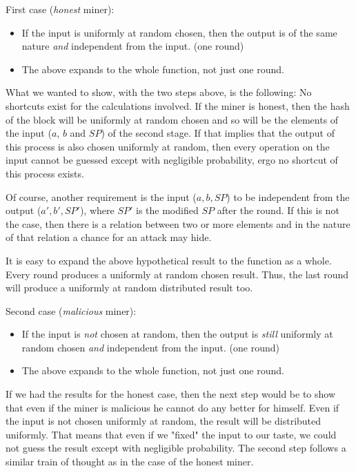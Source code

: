 First case (\emph{honest} miner):
\begin{itemize}
  \item If the input is uniformly at random chosen, then the output is of the same nature \emph{and} independent from the input. (one round)
  \item The above expands to the whole function, not just one round.
\end{itemize}

What we wanted to show, with the two steps above, is the following: No shortcuts exist for the calculations involved. If the miner is honest, then the hash of the block will be uniformly at random chosen and so will be the elements of the input ($a$, $b$ and $SP$) of the second stage. If that implies that the output of this process is also chosen uniformly at random, then every operation on the input cannot be guessed except with negligible probability, ergo no shortcut of this process exists.

Of course, another requirement is the input ($a,b,SP$) to be independent from the output ($a',b',SP'$), where $SP'$ is the modified $SP$ after the round. If this is not the case, then there is a relation between two or more elements and in the nature of that relation a chance for an attack may hide.

It is easy to expand the above hypothetical result to the function as a whole. Every round produces a uniformly at random chosen result. Thus, the last round will produce a uniformly at random distributed result too.

Second case (\emph{malicious} miner):
\begin{itemize}
  \item If the input is \emph{not} chosen at random, then the output is \emph{still} uniformly at random chosen \emph{and} independent from the input. (one round)
  \item The above expands to the whole function, not just one round.
\end{itemize}

If we had the results for the honest case, then the next step would be to show that even if the miner is malicious he cannot do any better for himself. Even if the input is not chosen uniformly at random, the result will be distributed uniformly. That means that even if we "fixed" the input to our taste, we could not guess the result except with negligible probability. The second step follows a similar train of thought as in the case of the honest miner.

